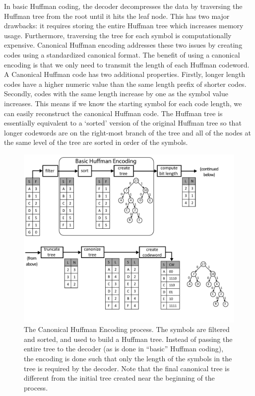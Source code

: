 In basic Huffman coding, the decoder decompresses the data by traversing the Huffman tree from the root until it hits the leaf node. This has two major drawbacks: it requires storing the entire Huffman tree which increases memory usage. Furthermore, traversing the tree for each symbol is computationally expensive. Canonical Huffman encoding addresses these two issues by creating codes using a standardized canonical format.  The benefit of using a canonical encoding is that we only need to transmit the length of each Huffman codeword.  A Canonical Huffman code has two additional properties.  Firstly, longer length codes have a higher numeric value than the same length prefix of shorter codes.  Secondly, codes with the same length increase by one as the symbol value increases. This means if we know the starting symbol for each code length, we can easily reconstruct the canonical Huffman code.  The Huffman tree is essentially equivalent to a `sorted' version of the original Huffman tree so that longer codewords are on the right-most branch of the tree and all of the nodes at the same level of the tree are sorted in order of the symbols.  

\begin{figure}
\centering
\includegraphics[width= \textwidth]{images/canonical_huffman_flow}
\caption{ The Canonical Huffman Encoding process. The symbols are filtered and sorted, and used to build a Huffman tree. Instead of passing the entire tree to the decoder (as is done in ``basic'' Huffman coding), the encoding is done such that only the length of the symbols in the tree is required by the decoder. Note that the final canonical tree is different from the initial tree created near the beginning of the process.}
\label{fig:canonical_huffman_flow}
\end{figure}

